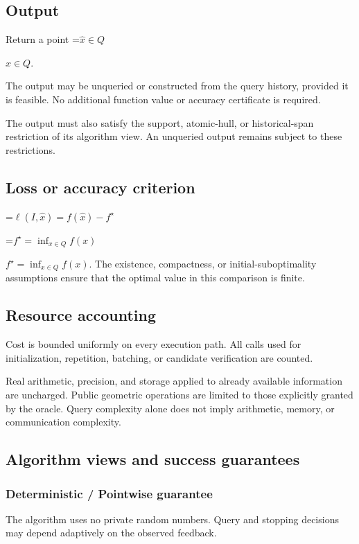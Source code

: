 \documentclass[10pt,a4paper]{article}
\newcommand{\AtlasMath}[1]{\par\begingroup\centering\setbox0=\hbox{$\displaystyle #1$}\ifdim\wd0>1.4\linewidth\typeout{ATLAS WIDE FORMULA: \the\wd0}\fi\ifdim\wd0>\linewidth\resizebox{\linewidth}{!}{\box0}\else\box0\fi\par\endgroup}
\newcommand{\AtlasInlineMath}[1]{\begingroup\setbox0=\hbox{$#1$}\ifdim\wd0>.4\linewidth\endgroup\AtlasMath{#1}\else\endgroup$#1$\fi}
\begin{document}
\subsection{Output}
Return a point \AtlasInlineMath{\widehat x\in Q}.

The output may be unqueried or constructed from the query history, provided it is feasible. No additional function value or accuracy certificate is required.

The output must also satisfy the support, atomic-hull, or historical-span restriction of its algorithm view. An unqueried output remains subject to these restrictions.

\subsection{Loss or accuracy criterion}

\AtlasMath{\ell(I,\widehat{x})=f(\widehat{x})-f^\star}


\AtlasInlineMath{f^\star=\inf_{x\in Q}f(x)}. The existence, compactness, or initial-suboptimality assumptions ensure that the optimal value in this comparison is finite.

\subsection{Resource accounting}
Cost is bounded uniformly on every execution path. All calls used for initialization, repetition, batching, or candidate verification are counted.

Real arithmetic, precision, and storage applied to already available information are uncharged. Public geometric operations are limited to those explicitly granted by the oracle. Query complexity alone does not imply arithmetic, memory, or communication complexity.

\subsection{Algorithm views and success guarantees}
\subsubsection{Deterministic / Pointwise guarantee}
The algorithm uses no private random numbers. Query and stopping decisions may depend adaptively on the observed feedback.
\end{document}
